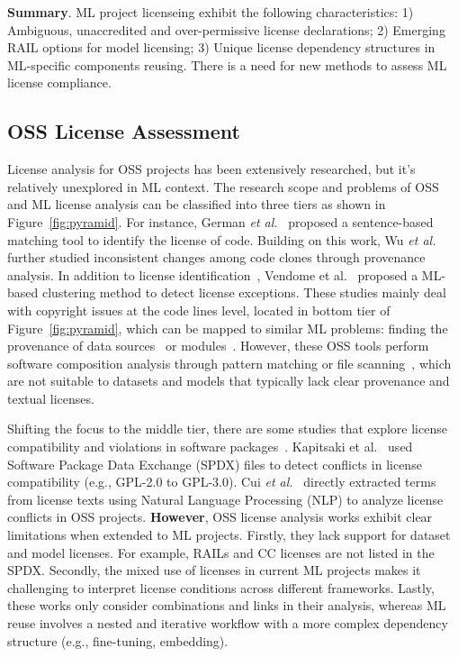 \vspace{-2mm}
\begin{tcolorbox}
\textbf{Summary}.
ML project licenseing exhibit the following characteristics:
1) Ambiguous, unaccredited and over-permissive license declarations;
2) Emerging RAIL options for model licensing;
3) Unique license dependency structures in ML-specific components reusing.
There is a need for new methods to assess ML license compliance.
\end{tcolorbox}



\subsection{OSS License Assessment}
License analysis for OSS projects has been extensively researched, but it's relatively unexplored in ML context.
The research scope and problems of OSS and ML license analysis can be classified into three tiers as shown in Figure~\ref{fig:pyramid}.
For instance, German \textit{et al.}~\cite{german2010sentence} proposed a sentence-based matching tool to identify the license of code.
Building on this work, Wu \textit{et al.}~\cite{wu2017analysis} further studied inconsistent changes among code clones through provenance analysis.
In addition to license identification~\cite{jaeger2017fossology}, Vendome et al.~\cite{vendome2017machine} proposed a ML-based clustering method to detect license exceptions.
These studies mainly deal with copyright issues at the code lines level, located in bottom tier of Figure~\ref{fig:pyramid}, which can be mapped to similar ML problems: finding the provenance of data sources~\cite{rajbahadur2021can} or modules~\cite{chen2022copy}.
However, these OSS tools perform software composition analysis through pattern matching or file scanning~\cite{ombredanne2020free}, which are not suitable to datasets and models that typically lack clear provenance and textual licenses.

Shifting the focus to the middle tier, there are some studies that explore license compatibility and violations in software packages~\cite{mathur2012empirical, wu2015method}. 
Kapitsaki et al.~\cite{kapitsaki2017automating} used Software Package Data Exchange (SPDX) files to detect conflicts in license compatibility (e.g., GPL-2.0 to GPL-3.0).
Cui \textit{et al.}~\cite{cui2023empirical} directly extracted terms from license texts using Natural Language Processing (NLP) to analyze license conflicts in OSS projects.
\textbf{However}, OSS license analysis works exhibit clear limitations when extended to ML projects.
Firstly, they lack support for dataset and model licenses. For example, RAILs and CC licenses are not listed in the SPDX. 
Secondly, the mixed use of licenses in current ML projects makes it challenging to interpret license conditions across different frameworks.
Lastly, these works only consider combinations and links in their analysis, whereas ML reuse involves a nested and iterative workflow with a more complex dependency structure (e.g., fine-tuning, embedding).

